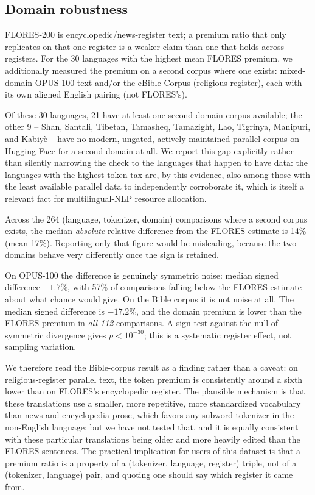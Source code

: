 \documentclass[11pt]{article}
\begin{document}
\subsection{Domain robustness}
\label{sec:domain-robustness}

FLORES-200 is encyclopedic/news-register text; a premium ratio that only
replicates on that one register is a weaker claim than one that holds
across registers. For the 30 languages with the highest mean FLORES premium,
we additionally measured the premium on a second corpus where one exists:
mixed-domain OPUS-100 text \citep{zhang2020opus100} and/or the eBible
Corpus \citep{akerman2023ebible} (religious register), each with its own
aligned English pairing (not FLORES's).

Of these 30 languages, 21 have at least one second-domain corpus available;
the other 9 -- Shan, Santali, Tibetan, Tamasheq, Tamazight, Lao, Tigrinya,
Manipuri, and Kabiy\`{e} -- have no modern, ungated, actively-maintained
parallel corpus on Hugging Face for a second domain at all. We report this
gap explicitly rather than silently narrowing the check to the languages
that happen to have data: the languages with the highest token tax are, by
this evidence, also among those with the least available parallel data to
independently corroborate it, which is itself a relevant fact for
multilingual-NLP resource allocation.

Across the 264 (language, tokenizer, domain) comparisons where a second
corpus exists, the median \emph{absolute} relative difference from the
FLORES estimate is 14\% (mean 17\%). Reporting only that figure would be
misleading, because the two domains behave very differently once the sign is
retained.

On OPUS-100 the difference is genuinely symmetric noise: median signed
difference $-1.7$\%, with 57\% of comparisons falling below the FLORES
estimate -- about what chance would give. On the Bible corpus it is not
noise at all. The median signed difference is $-17.2$\%, and the domain
premium is lower than the FLORES premium in \emph{all 112} comparisons.
A sign test against the null of symmetric divergence gives $p < 10^{-30}$;
this is a systematic register effect, not sampling variation.

We therefore read the Bible-corpus result as a finding rather than a
caveat: on religious-register parallel text, the token premium is
consistently around a sixth lower than on FLORES's encyclopedic register.
The plausible mechanism is that these translations use a smaller, more
repetitive, more standardized vocabulary than news and encyclopedia prose,
which favors any subword tokenizer in the non-English language; but we have
not tested that, and it is equally consistent with these particular
translations being older and more heavily edited than the FLORES sentences.
The practical implication for users of this dataset is that a premium ratio
is a property of a (tokenizer, language, register) triple, not of a
(tokenizer, language) pair, and quoting one should say which register it
came from.
\end{document}
